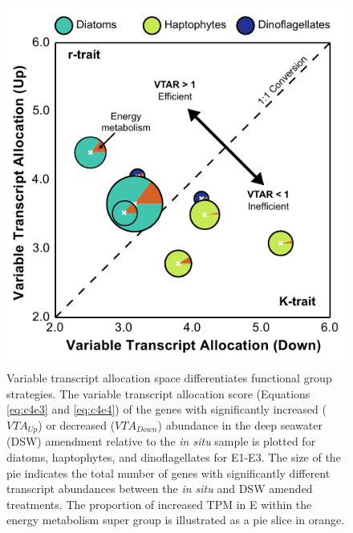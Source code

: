 \begin{figure}[p!]
  \centering
    \includegraphics[width=.8\textwidth]{Images/C4_Figure4_Final.pdf}
    \caption[Variable transcript allocation space differentiates functional group strategies]{Variable transcript allocation space differentiates functional group strategies. The variable transcript allocation score (Equations \ref{eq:c4e3} and \ref{eq:c4e4}) of the genes with significantly increased ($VTA_{Up}$) or decreased ($VTA_{Down}$) abundance in the deep seawater (DSW) amendment relative to the \textit{in situ} sample is plotted for diatoms, haptophytes, and dinoflagellates for E1-E3. The size of the pie indicates the total number of genes with significantly different transcript abundances between the \textit{in situ} and DSW amended treatments. The proportion of increased TPM in E within the energy metabolism super group is illustrated as a pie slice in orange.}
  \label{fig:c4f4}
\end{figure}




